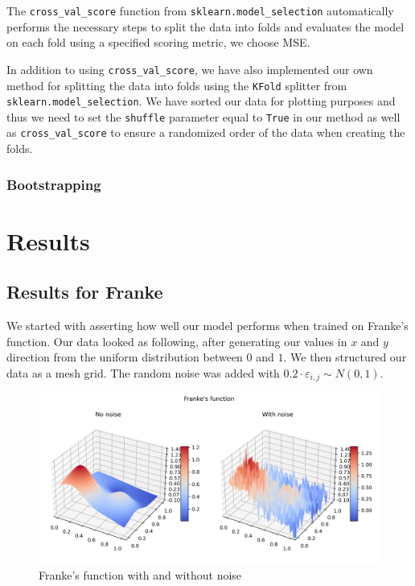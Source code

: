 \documentclass{article}
\begin{document}
The \verb|cross_val_score| function from \verb|sklearn.model_selection| automatically performs the necessary steps to split the data into folds and evaluates the model on each fold using a specified scoring metric, we choose MSE.

In addition to using \verb|cross_val_score|, we have also implemented our own method for splitting the data into folds using the \verb|KFold| splitter from \verb|sklearn.model_selection|. We have sorted our data for plotting purposes and thus we need to set the \verb|shuffle| parameter equal to \verb|True| in our method as well as \verb|cross_val_score| to ensure a randomized order of the data when creating the folds.


\subsubsection{Bootstrapping}


\newpage

\section{Results}
\subsection{Results for Franke}
We started with asserting how well our model performs when trained on Franke's function. Our data looked as following, after generating our values in $x$ and $y$ direction from the uniform distribution between $0$ and $1$. We then structured our data as a mesh grid. The random noise was added with $0.2 \cdot \varepsilon_{i,j} \sim N(0, 1)$.
\begin{figure}[htbp]
    \centering
    \includegraphics[width=\textwidth]{Franke/FrankesFunction.png}
    \caption{Franke's function with and without noise}
\end{figure}
\end{document}
